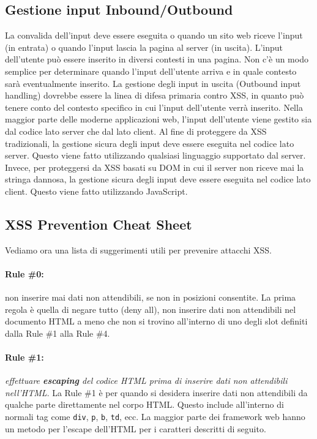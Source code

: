 \subsection{Gestione input Inbound/Outbound}

La convalida dell'input deve essere eseguita o quando un sito web riceve l'input
(in entrata)
o quando l'input lascia la pagina al server (in uscita).
L'input dell'utente può essere inserito in diversi contesti in una pagina.
Non c'è un modo
semplice per determinare quando l'input dell'utente arriva e in quale contesto sarà
eventualmente inserito. La gestione degli input in uscita (Outbound input handling)
dovrebbe
essere la linea di difesa primaria contro XSS, in quanto può tenere conto del
contesto
specifico in cui l'input dell'utente verrà inserito.
Nella maggior parte delle moderne applicazioni web, l'input dell'utente viene
gestito sia dal
codice lato server che dal lato client.
Al fine di proteggere da XSS tradizionali, la gestione sicura degli input deve
essere
eseguita nel codice lato server. Questo viene fatto utilizzando qualsiasi linguaggio
supportato dal server. Invece, per proteggersi da XSS basati su DOM in cui il
server non riceve mai la stringa
dannosa, la gestione sicura degli input deve essere eseguita nel codice lato client.
Questo viene fatto utilizzando JavaScript.

\newpage

\subsection{XSS Prevention Cheat Sheet}

Vediamo ora una lista di suggerimenti utili per prevenire attacchi XSS.

\paragraph{Rule \#0:} non inserire mai dati non attendibili, se non in posizioni
consentite.
La prima regola è quella di negare tutto (deny all), non inserire dati non
attendibili nel documento HTML a meno che non si trovino all'interno di uno degli
slot definiti dalla Rule \#1 alla Rule \#4.

\paragraph{Rule \#1:} \textit{effettuare \textbf{escaping} del codice HTML
      prima di inserire dati non attendibili nell'HTML}.
La Rule \#1 è per quando si desidera inserire dati non attendibili da qualche
parte
direttamente nel corpo HTML. Questo include all'interno di normali tag come
\verb|div|, \verb|p|, \verb|b|, \verb|td|,
ecc. La maggior parte dei framework web hanno un metodo per l'escape dell'HTML
per i caratteri descritti di seguito.

